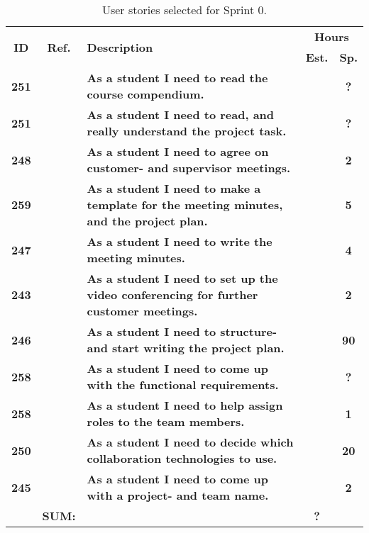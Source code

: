 \begin{table*}[!ht]
\caption{User stories selected for Sprint 0. }
\label{tab:sprint0stories}
\def\arraystretch{1.25}
\begin{tabularx}{\textwidth}{ccXcc} 
\toprule[1mm]

\multirow{2}{*}{\textbf{ID}} &
\multirow{2}{*}{\textbf{Ref.}} & \multirow{2}{*}{\textbf{Description}} & \multicolumn{2}{c}{\textbf{Hours}} \\
 					& & & \textbf{Est.} & \textbf{Sp.} \\

\midrule
\textbf{251} 	&
	& \textbf{As a student I need to read the course compendium.} 										& 			& \textbf{?} \\

\textbf{251} 	&
	& \textbf{As a student I need to read, and really understand the project task.} 					& 			& \textbf{?} \\	


\textbf{248} 	&
	& \textbf{As a student I need to agree on customer- and supervisor meetings.} 						& 			& \textbf{2} \\


\textbf{259} 	& 
	& {\bf As a student I need to make a template for the meeting minutes, and the project plan.} 		& 			& \textbf{5} \\


\textbf{247} 	&
	& \textbf{As a student I need to write the meeting minutes.} 										&  			& \textbf{4} \\

\textbf{243} 	&
	& \textbf{As a student I need to set up the video conferencing for further customer meetings.} 		& 			& \textbf{2} \\

\textbf{246} 	&
	& \textbf{As a student I need to structure- and start writing the project plan.} 					&  			& \textbf{90} \\

\textbf{258} 	&
	& \textbf{As a student I need to come up with the functional requirements.} 						&  			& \textbf{?} \\

\textbf{258} 	&
	& \textbf{As a student I need to help assign roles to the team members.} 							& 			& \textbf{1} \\

\textbf{250} 	&
	& \textbf{As a student I need to decide which collaboration technologies to use.} 					& 			& \textbf{20} \\
\textbf{245} 	& 
	& \textbf{As a student I need to come up with a project- and team name.} 							& 			& \textbf{2} \\
\midrule
				& \textbf{SUM:}		&			& \textbf{?}
 \\																			
\bottomrule[1mm]
\end{tabularx}
\end{table*}